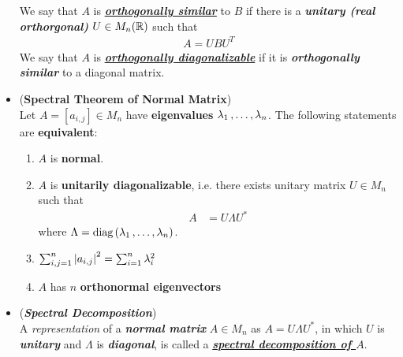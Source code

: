 \documentclass[11pt]{article}
\begin{document}
\begin{itemize}
\begin{definition}
We say that $A$ is  \underline{\emph{\textbf{orthogonally similar}}} to $B$ if there is a \emph{\textbf{unitary (real orthorgonal)}} $U \in M_n({\mathbb R})$ such that
\begin{align*}
A = U B U^{T}
\end{align*} We say that $A$ is \underline{\emph{\textbf{orthogonally diagonalizable}}} if it is \textbf{\emph{orthogonally similar}} to a diagonal matrix.
\end{definition}



\item \begin{theorem} (\textbf{Spectral Theorem of Normal Matrix})   \citep{horn2012matrix}\\
Let $A = [a_{i,j}] \in M_n$ have \textbf{eigenvalues} $\lambda_1 \,{,}\ldots{,}\, \lambda_n$. The following statements are \textbf{equivalent}:
\begin{enumerate}
\item $A$ is \textbf{normal}.
\item $A$ is \textbf{unitarily diagonalizable}, i.e. there exists unitary matrix $U \in M_n$ such that 
\begin{align*}
A &= U \Lambda U^{*}
\end{align*} where $\Lambda = \text{diag}\left(\lambda_1 \,{,}\ldots{,}\, \lambda_n\right)$.
\item $\sum_{i,j=1}^{n}\left\lvert a_{i,j} \right\rvert^2 = \sum_{i=1}^{n}\lambda_i^2$
\item $A$ has $n$ \textbf{orthonormal eigenvectors}
\end{enumerate}
\end{theorem}


\item \begin{definition} (\emph{\textbf{Spectral Decomposition}})\\
A \emph{representation} of a \emph{\textbf{normal matrix}} $A \in M_n$ as $A = U \Lambda U^{*}$, in which $U$ is \emph{\textbf{unitary}} and $\Lambda$ is \emph{\textbf{diagonal}}, is called a \underline{\emph{\textbf{spectral decomposition of $A$}}}.
\end{definition}


\end{itemize}
\end{document}
